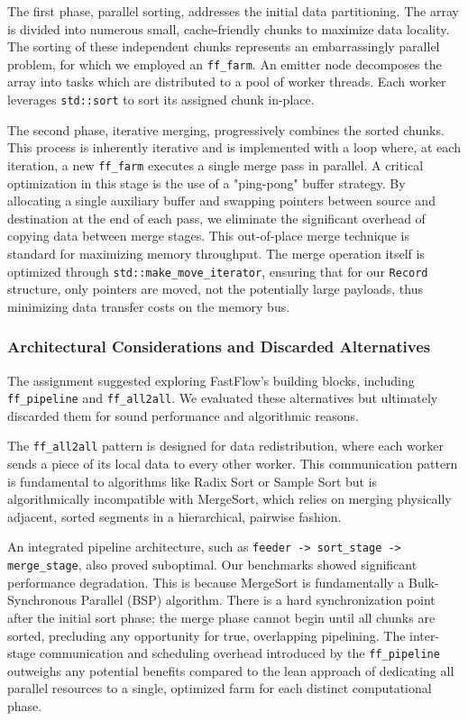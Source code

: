 \documentclass[10pt]{article}
\newcommand{\code}[1]{\texttt{#1}}
\begin{document}
The first phase, parallel sorting, addresses the initial data partitioning. The array is divided into numerous small, cache-friendly chunks to maximize data locality. The sorting of these independent chunks represents an embarrassingly parallel problem, for which we employed an \code{ff\_farm}. An emitter node decomposes the array into tasks which are distributed to a pool of worker threads. Each worker leverages \code{std::sort} to sort its assigned chunk in-place.

The second phase, iterative merging, progressively combines the sorted chunks. This process is inherently iterative and is implemented with a loop where, at each iteration, a new \code{ff\_farm} executes a single merge pass in parallel. A critical optimization in this stage is the use of a "ping-pong" buffer strategy. By allocating a single auxiliary buffer and swapping pointers between source and destination at the end of each pass, we eliminate the significant overhead of copying data between merge stages. This out-of-place merge technique is standard for maximizing memory throughput. The merge operation itself is optimized through \code{std::make\_move\_iterator}, ensuring that for our \code{Record} structure, only pointers are moved, not the potentially large payloads, thus minimizing data transfer costs on the memory bus.

\subsubsection{Architectural Considerations and Discarded Alternatives}
The assignment suggested exploring FastFlow's building blocks, including \code{ff\_pipeline} and \code{ff\_all2all}. We evaluated these alternatives but ultimately discarded them for sound performance and algorithmic reasons.

The \code{ff\_all2all} pattern is designed for data redistribution, where each worker sends a piece of its local data to every other worker. This communication pattern is fundamental to algorithms like Radix Sort or Sample Sort but is algorithmically incompatible with MergeSort, which relies on merging physically adjacent, sorted segments in a hierarchical, pairwise fashion.

An integrated pipeline architecture, such as \code{feeder -> sort\_stage -> merge\_stage}, also proved suboptimal. Our benchmarks showed significant performance degradation. This is because MergeSort is fundamentally a Bulk-Synchronous Parallel (BSP) algorithm. There is a hard synchronization point after the initial sort phase; the merge phase cannot begin until all chunks are sorted, precluding any opportunity for true, overlapping pipelining. The inter-stage communication and scheduling overhead introduced by the \code{ff\_pipeline} outweighs any potential benefits compared to the lean approach of dedicating all parallel resources to a single, optimized farm for each distinct computational phase.
\end{document}
